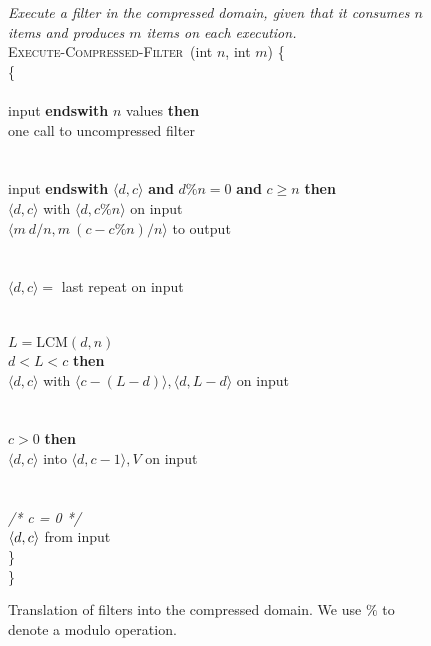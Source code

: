 \begin{figure}[t!]
\centering
\begin{minipage}{0.7\textwidth}
{\it Execute a filter in the compressed domain, given that it consumes
  $n$ items and produces $m$ items on each execution.}\\
\textsc{Execute-Compressed-Filter}~(int $n$, int $m$) \{\\
 \{\\
\tab{} \\
\tab{} input {\bf endswith} $n$ values {\bf then}\\
\tab\tab{} one call to uncompressed filter\\
\tab\tab~\\
\tab{} \\
\tab{} input {\bf endswith} $\langle d,c \rangle$ {\bf and} $d\%n = 0$ {\bf and} $c \geq n$ {\bf then}\\
\tab\tab{} $\langle d,c \rangle$ with $\langle d, c\%n\rangle$ on input\\
\tab\tab{} $\langle m~d/n, m~(c-c\%n)/n \rangle$ to output\\
\tab\tab~\\
\tab{}\\
\tab\tab{} $\langle d,c \rangle = $ last repeat on input\\
\tab\tab\\
\tab\tab{}\\
\tab\tab{} $L = \mbox{LCM}(d, n)$\\
\tab\tab{} $d < L < c$ {\bf then}\\
\tab\tab\tab{} $\langle d,c \rangle$ with $\langle c - (L - d) \rangle, \langle d, L - d\rangle$ on input\\
\tab\tab\\
\tab\tab{}\\
\tab\tab{} $c > 0$ {\bf then}\\
\tab\tab\tab{} $\langle d,c \rangle$ into $\langle d,c-1\rangle,V$ on input\\
\tab\tab\tab\tab\\
\tab\tab{}\\
\tab\tab{} {\it /* c = 0 */}\\
\tab\tab\tab{} $\langle d, c\rangle$ from input\\
\tab\}\\
\}
\end{minipage}
\caption[Translation of filters into the compressed
  domain]{Translation of filters into the compressed domain.  We use
  $\%$ to denote a modulo operation.
\protect\label{fig:translate-filter}}
\end{figure}

